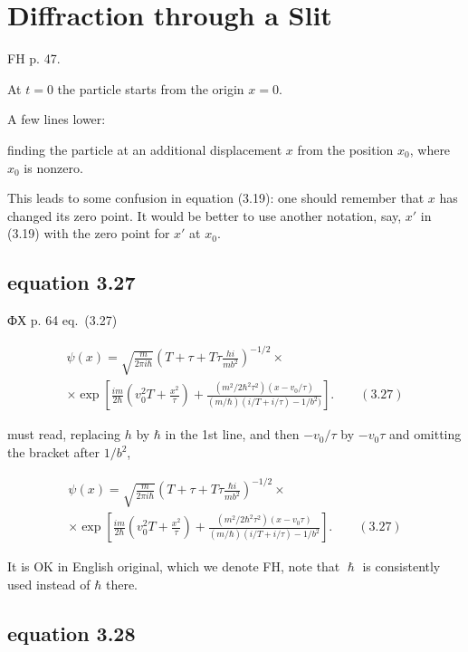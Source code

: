 \documentclass[11pt,a4paper]{report}
\begin{document}
\section{Diffraction through a Slit}

FH p. 47.

At $t = 0$ the particle starts from the origin $x = 0$.

A few lines lower:

finding the particle at an additional displacement $x$ from the position $x_0$, where $x_0$ is nonzero.

This leads to some confusion in equation (3.19): one should remember that $x$ has changed its zero point.
It would be better to use another notation, say, $x'$ in (3.19) with the zero point for $x'$ at $x_0$.

\subsection*{equation 3.27}

ФХ p. 64 eq.~(3.27)

\begin{eqnarray*}
 \psi(x) =   \sqrt{\frac{m}{2\pi i \hbar}} \left(T + \tau + T \tau \frac{h i}{m b^2}\right)^{-1/2} \times \\
 \times \exp\left[\frac{im}{2\hbar}\left(v_0^2T + \frac{x^2}{\tau} \right)
 + \frac{(m^2/2\hbar^2\tau^2)(x-v_0/\tau)}{(m/\hbar)(i/T+i/\tau) - 1/b^2) } \right] .
 \qquad (3.27)
\end{eqnarray*}

must read, replacing $h$ by $\hbar$ in the 1st line, and then $-v_0/\tau$ by  $-v_0\tau$ and omitting the bracket after $1/b^2$,

\begin{eqnarray*}
 \psi(x) =   \sqrt{\frac{m}{2\pi i \hbar}} \left(T + \tau + T \tau \frac{\hbar i}{m b^2}\right)^{-1/2} \times \\
 \times \exp\left[\frac{im}{2\hbar}\left(v_0^2T + \frac{x^2}{\tau} \right)
 + \frac{(m^2/2\hbar^2\tau^2)(x-v_0\tau)}{(m/\hbar)(i/T+i/\tau) - 1/b^2 } \right] .
 \qquad (3.27)
\end{eqnarray*}

It is OK in English original, which we denote FH, note that $\hslash$ is consistently used
instead of $\hbar$ there.

\subsection*{equation 3.28}
\end{document}

